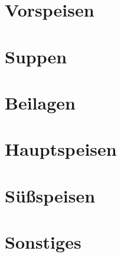 \documentclass[twocolumn]{cookbook}
\begin{document}
\chapter{Vorspeisen}


\chapter{Suppen}


\chapter{Beilagen}


\chapter{Hauptspeisen}


\chapter{Süßspeisen}


\chapter{Sonstiges}


\printbibliography
\printindex[region]
\printindex[ingredient]
\printindex[vegetarian]
\printindex[vegan]
\printindex
\end{document}
